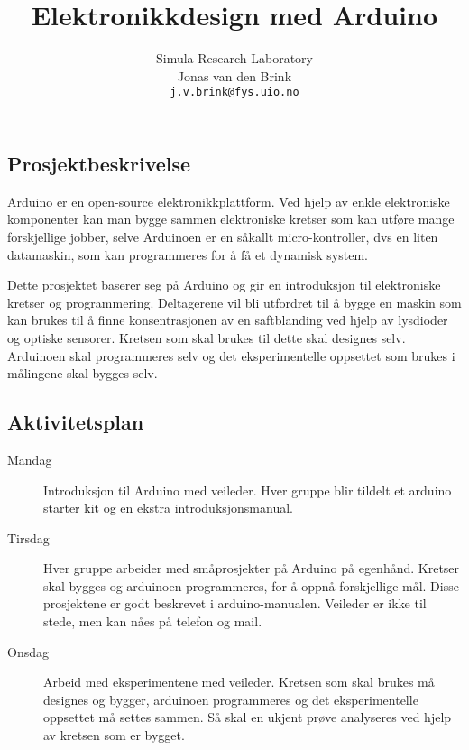 \documentclass[a4paper, 11pt, notitlepage, english]{article}
\author{Simula Research Laboratory \\ Jonas van den Brink \\ \texttt{j.v.brink@fys.uio.no}}
\title{Elektronikkdesign med Arduino}
\begin{document}
\maketitle
\thispagestyle{empty}

\subsection*{Prosjektbeskrivelse}
Arduino er en open-source elektronikkplattform. Ved hjelp av enkle elektroniske komponenter kan man bygge sammen elektroniske kretser som kan utføre mange forskjellige jobber, selve Arduinoen er en såkallt micro-kontroller, dvs en liten datamaskin, som kan programmeres for å få et dynamisk system. 

Dette prosjektet baserer seg på Arduino og gir en introduksjon til elektroniske kretser og programmering. Deltagerene vil bli utfordret til å bygge en maskin som kan brukes til å finne konsentrasjonen av en saftblanding ved hjelp av lysdioder og optiske sensorer. Kretsen som skal brukes til dette skal designes selv. Arduinoen skal programmeres selv og det eksperimentelle oppsettet som brukes i målingene skal bygges selv.

\subsection*{Aktivitetsplan}

\begin{description}
	\item[Mandag] $ $\\
	Introduksjon til Arduino med veileder. Hver gruppe blir tildelt et arduino starter kit og en ekstra introduksjonsmanual.
	\item[Tirsdag] $ $ \\
	Hver gruppe arbeider med småprosjekter på Arduino på egenhånd. Kretser skal bygges og arduinoen programmeres, for å oppnå forskjellige mål. Disse prosjektene er godt beskrevet i arduino-manualen. Veileder er ikke til stede, men kan nåes på telefon og mail.
	\item[Onsdag] $ $ \\
	Arbeid med eksperimentene med veileder. Kretsen som skal brukes må designes og bygger, arduinoen programmeres og det eksperimentelle oppsettet må settes sammen. Så skal en ukjent prøve analyseres ved hjelp av kretsen som er bygget.	
\end{description}
\end{document}
